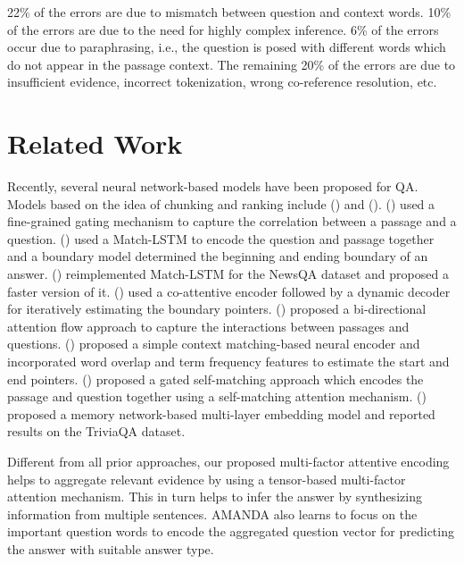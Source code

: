 \documentclass[letterpaper]{article} %
\begin{document}
22\% of the errors are due to mismatch between question and context words.
10\% of the errors are due to the need for highly complex inference.
6\% of the errors occur due to paraphrasing, i.e., the question is posed with different words which do not appear in the passage context.
The remaining 20\% of the errors are due to insufficient evidence, incorrect tokenization, wrong co-reference resolution, etc.
\section{Related Work}
\label{sec:related_works}
Recently, several neural network-based models have been proposed for QA.
Models based on the idea of chunking and ranking include \citeauthor{ibm_squad} (\citeyear{ibm_squad}) and \citeauthor{google_squad} (\citeyear{google_squad}).
\citeauthor{cmu_squad} (\citeyear{cmu_squad}) used a fine-grained gating mechanism to capture the correlation between a passage and a question.
\citeauthor{smu_squad} (\citeyear{smu_squad}) used a Match-LSTM to encode the question and passage together and a boundary model determined the beginning and ending boundary of an answer.
\citeauthor{newsqa} (\citeyear{newsqa}) reimplemented Match-LSTM for the NewsQA dataset and proposed a faster version of it.
\citeauthor{salesforce_squad} (\citeyear{salesforce_squad}) used a co-attentive encoder followed by a dynamic decoder for iteratively estimating the boundary pointers.
\citeauthor{allenai_squad} (\citeyear{allenai_squad}) proposed a bi-directional attention flow approach to capture the interactions between passages and questions.
\citeauthor{fastqa_squad} (\citeyear{fastqa_squad}) proposed a simple context matching-based neural encoder and incorporated word overlap and term frequency features to estimate the start and end pointers.
\citeauthor{rnet_squad} (\citeyear{rnet_squad}) proposed a gated self-matching approach which encodes the passage and question together using a self-matching attention mechanism.
\citeauthor{memen} (\citeyear{memen}) proposed a memory network-based multi-layer embedding model and reported results on the TriviaQA dataset.

Different from all prior approaches, our proposed multi-factor attentive encoding helps to aggregate relevant evidence by using a tensor-based multi-factor attention mechanism. This in turn helps to infer the answer by synthesizing information from multiple sentences.
AMANDA also learns to focus on the important question words to encode the aggregated question vector for predicting the answer with suitable answer type.
\end{document}
